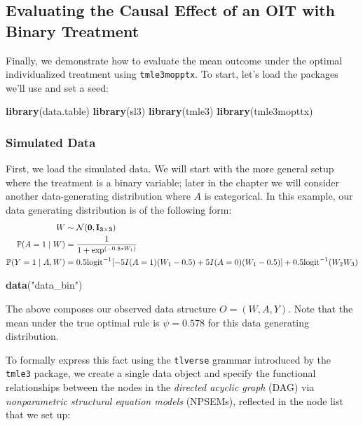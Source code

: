 \documentclass[12pt, krantz2,]{krantz}
\newenvironment{Shaded}{\begin{snugshade}}{\end{snugshade}}
\newcommand{\KeywordTok}[1]{\textcolor[rgb]{0.27,0.27,0.27}{\textbf{#1}}}
\newcommand{\NormalTok}[1]{#1}
\newcommand{\StringTok}[1]{\textcolor[rgb]{0.5,0.5,0.5}{#1}}
\theoremstyle{definition}
\theoremstyle{definition}
\theoremstyle{definition}
\renewcommand{\P}{\mathbb{P}}
\newcommand{\1}{\mathbbm{1}}
\begin{document}
\hypertarget{oit-eval-bin}{%
\subsection{Evaluating the Causal Effect of an OIT with Binary Treatment}\label{oit-eval-bin}}

Finally, we demonstrate how to evaluate the mean outcome under the optimal
individualized treatment using \texttt{tmle3mopptx}. To start, let's load the packages
we'll use and set a seed:

\begin{Shaded}
\begin{Highlighting}[]
\KeywordTok{library}\NormalTok{(data.table)}
\KeywordTok{library}\NormalTok{(sl3)}
\KeywordTok{library}\NormalTok{(tmle3)}
\KeywordTok{library}\NormalTok{(tmle3mopttx)}
\end{Highlighting}
\end{Shaded}

\hypertarget{simulated-data}{%
\subsubsection{Simulated Data}\label{simulated-data}}

First, we load the simulated data. We will start with the more general setup
where the treatment is a binary variable; later in the chapter we will consider
another data-generating distribution where \(A\) is categorical. In this example,
our data generating distribution is of the following form:
\begin{align*}
  W &\sim \mathcal{N}(\bf{0},I_{3 \times 3})\\
  \P(A=1 \mid W) &= \frac{1}{1+\exp^{(-0.8*W_1)}}\\
  \P(Y=1 \mid A,W) &= 0.5\text{logit}^{-1}[-5I(A=1)(W_1-0.5)+5I(A=0)(W_1-0.5)] +
     0.5\text{logit}^{-1}(W_2W_3)
\end{align*}

\begin{Shaded}
\begin{Highlighting}[]
\KeywordTok{data}\NormalTok{(}\StringTok{"data_bin"}\NormalTok{)}
\end{Highlighting}
\end{Shaded}

The above composes our observed data structure \(O = (W, A, Y)\). Note that the
mean under the true optimal rule is \(\psi=0.578\) for this data generating
distribution.

To formally express this fact using the \texttt{tlverse} grammar introduced by the
\texttt{tmle3} package, we create a single data object and specify the functional
relationships between the nodes in the \emph{directed acyclic graph} (DAG) via
\emph{nonparametric structural equation models} (NPSEMs), reflected in the node list
that we set up:
\end{document}
